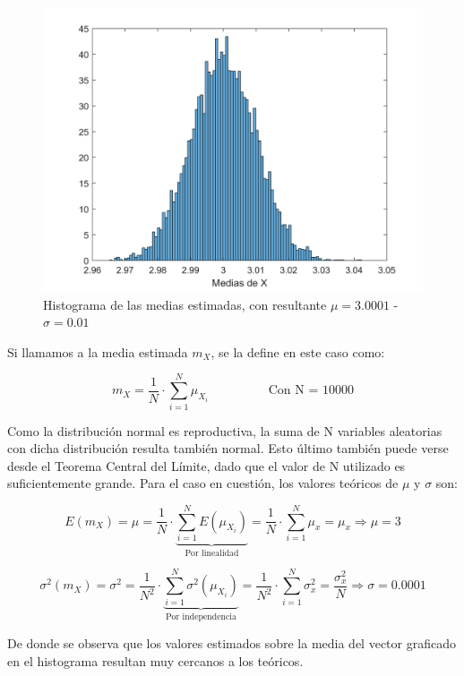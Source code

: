 \begin{figure}[!ht]
\begin{centering}
\includegraphics[scale=0.55]{Imagenes/MediasX.png}
\par\end{centering}
\caption{Histograma de las medias estimadas, con resultante $\mu = 3.0001$ - $\sigma = 0.01$}

\end{figure} 

Si llamamos a la media estimada $m_X$, se la define en este caso como:

\[
m_X = \frac{1}{N} \cdot \sum^N_{i=1} \mu_{X_i} \hspace{2cm} \textrm{Con N = 10000} 
\]

Como la distribuci\'on normal es reproductiva, la suma de N variables aleatorias con dicha distribuci\'on resulta tambi\'en normal. Esto \'ultimo tambi\'en puede verse desde el Teorema Central del L\'imite, dado que el valor de N utilizado es suficientemente grande. Para el caso en cuesti\'on, los valores te\'oricos de $\mu$ y $\sigma$ son:

\[
E(m_X) = \mu = \frac{1}{N} \cdot \underbrace{\sum^N_{i=1} E(\mu_{X_i})}_{\textrm{Por linealidad}} = \frac{1}{N} \cdot \sum^N_{i=1} \mu_x = \mu_x \Longrightarrow \mu = 3
\]

\[
\sigma^2(m_X) = \sigma^2 = \frac{1}{N^2} \cdot \underbrace{\sum^N_{i=1} \sigma^2(\mu_{X_i})}_{\textrm{Por independencia}} = \frac{1}{N^2} \cdot \sum^N_{i=1} \sigma^2_x = \frac{\sigma^2_x}{N} \Longrightarrow \sigma = 0.0001
\]

De donde se observa que los valores estimados sobre la media del vector graficado en el histograma resultan muy cercanos a los te\'oricos.

